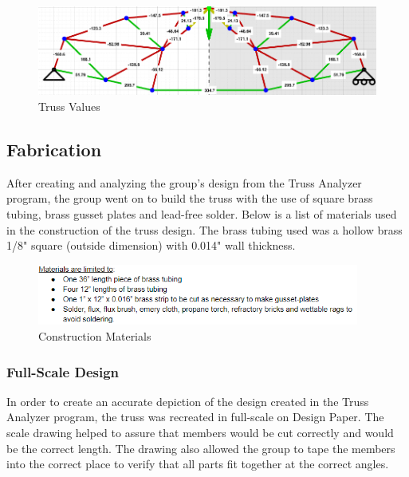 \documentclass{article}
\begin{document}
\begin{figure}[ht]
\caption{Truss Values}
\centering
\includegraphics[width=400pt]{TrussDesignWithValues.png}
\end{figure}

\subsection{Fabrication}
After creating and analyzing the group's design from the Truss Analyzer program, the group went on to build the truss with the use of square brass tubing, brass gusset plates and lead-free solder. Below is a list of materials used in the construction of the truss design. The brass tubing used was a hollow brass 1/8" square (outside dimension) with 0.014" wall thickness. 

\begin{figure}[ht]
\caption{Construction Materials}
\centering
\includegraphics[width=300pt]{ConstructionMaterials.png}
\end{figure}

\subsubsection{Full-Scale Design}
In order to create an accurate depiction of the design created in the Truss Analyzer program, the truss was recreated in full-scale on Design Paper. The scale drawing helped to assure that members would be cut correctly and would be the correct length. The drawing also allowed the group to tape the members into the correct place to verify that all parts fit together at the correct angles. 
\end{document}
